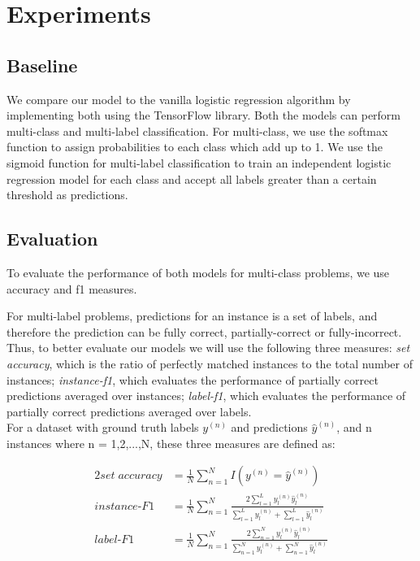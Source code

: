 \chapter{Experiments}

\section{Baseline}

We compare our model to the vanilla logistic regression algorithm by implementing both using the TensorFlow library. Both the models can perform multi-class and multi-label classification. For multi-class, we use the softmax function to assign probabilities to each class which add up to 1. We use the sigmoid function for multi-label classification to train an independent logistic regression model for each class and accept all labels greater than a certain threshold as predictions.

\section{Evaluation}

To evaluate the performance of both models for multi-class problems, we use accuracy and f1 measures.

For multi-label problems, predictions for an instance is a set of labels, and therefore the prediction can be fully correct, partially-correct or fully-incorrect. Thus, to better evaluate our models we will use the following three measures: \textit{set accuracy}, which is the ratio of perfectly matched instances to the total number of instances; \textit{instance-f1}, which evaluates the performance of partially correct predictions averaged over instances; \textit{label-f1}, which evaluates the performance of partially correct predictions averaged over labels.\\

For a dataset with ground truth labels $y^{(n)}$ and predictions $\hat{y}^{(n)}$, and n instances where n = 1,2,...,N, these three measures are defined as:

\begin{alignat}{2}
set\; accuracy & = \frac{1}{N} \sum_{n=1}^{N} {I(y^{(n)} = \hat{y}^{(n)})}\\
instance \mbox{-} F1 & = \frac{1}{N} \sum_{n=1}^{N} \frac{2\sum_{l=1}^{L} {y^{(n)}_{l} \hat{y}^{(n)}_{l}}}{\sum_{l=1}^{L} {y^{(n)}_{l}} + \sum_{l=1}^{L} {\hat{y}^{(n)}_{l}}}\\
label \mbox{-} F1 & = \frac{1}{N} \sum_{n=1}^{N} \frac{2\sum_{n=1}^{N} {y^{(n)}_{l} \hat{y}^{(n)}_{l}}}{\sum_{n=1}^{N} {y^{(n)}_{l}} + \sum_{n=1}^{N} {\hat{y}^{(n)}_{l}}}
\end{alignat}

